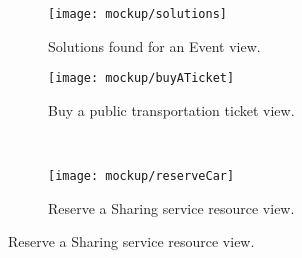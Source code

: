 \begin{figure}[H]
	\caption{Samples of the Travel logic module.}
	
	\begin{subfigure}{0.5\textwidth}
		\texttt{[image: mockup/solutions]} 
		\centering
		\caption{Solutions found for an Event view.}
		\label{fig:solutions}
	\end{subfigure}
	\begin{subfigure}{0.5\textwidth}
		\texttt{[image: mockup/buyATicket]} 
		\centering
		\caption{Buy a public transportation ticket view.}
		\label{fig:buyTicket}
	\end{subfigure} \\
	\begin{subfigure}{\linewidth}
		\texttt{[image: mockup/reserveCar]} 
		\centering
		\caption{Reserve a Sharing service resource view.}
		\label{fig:reserveCar}
	\end{subfigure}

	\label{fig:travelLogic}
\end{figure}

\vfill